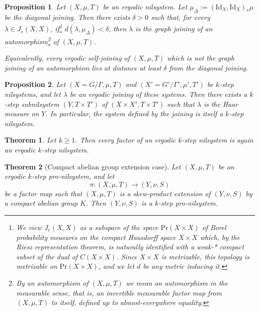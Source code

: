 \documentclass[10pt,a4paper]{amsart}
\newtheorem{proposition}{Proposition}
\newtheorem{theorem}{Theorem}
\begin{document}
\begin{proposition}\label{prop:neighbourhood_diag_joining_graph}
Let $(X,\mu,T)$ be an ergodic nilsystem. Let $\mu_\Delta := (\mathrm{Id}_X,\mathrm{Id}_X)_*\mu$ be the diagonal joining. Then there exists $\delta>0$ such that, for every
$\lambda\in J_e(X,X)$, if\footnote{We view $J_e(X,X)$ as a subspace of the space $\mathrm{Pr}(X\times X)$  of Borel probability measures on the compact Hausdorff space $X\times X$ which, by the Riesz representation theorem, is naturally identified with a weak-* compact subset of the dual of $C(X\times X)$. 
Since $X\times X$ is metrizable, this topology is metrizable on $\mathrm{Pr}(X\times X)$, and we let $d$ be any metric inducing it.} $d(\lambda,\mu_\Delta)<\delta$, then $\lambda$ is the graph joining of an automorphism\footnote{By an automorphism of $(X,\mu,T)$ we mean an automorphism in the measurable sense, that is, an invertible measurable factor map from $(X,\mu,T)$ to itself, defined up to almost-everywhere equality.} of $(X,\mu,T)$. 

Equivalently, every ergodic self-joining of $(X,\mu,T)$ which is not the
graph joining of an automorphism lies at distance at least $\delta$ from the
diagonal joining. 
\end{proposition}

\begin{proposition}\label{prop:joining_nilsystems_is_nilsystem}
    Let $(X = G/\Gamma, \mu, T)$ and $(X' = G'/\Gamma', \mu', T')$ be $k$-step nilsystems, and let $\lambda$ be an ergodic joining of these systems.
    Then there exists a $k$-step subnilsystem $(Y,T\times T')$ of $(X\times X',T\times T')$ such that $\lambda$ is the Haar measure on $Y$.
    In particular, the system defined by the joining is itself a $k$-step nilsystem.
\end{proposition}

\begin{theorem}\label{thrm:factor_of_nilsystem_is_nilsystem}
    Let $k \geq 1$.
    Then every factor of an ergodic $k$-step nilsystem is again an ergodic $k$-step nilsystem.
\end{theorem}

\begin{theorem}[Compact abelian group extension case]\label{thrm:special_case}
    Let $(X,\mu,T)$ be an ergodic $k$-step pro-nilsystem, and let
    \[
    \pi \colon (X,\mu,T)\to (Y,\nu,S)
    \]
    be a factor map such that $(X,\mu,T)$ is a skew-product extension of $(Y,\nu,S)$ by a compact abelian group $K$.
    Then $(Y,\nu,S)$ is a $k$-step pro-nilsystem.
\end{theorem}
\end{document}

